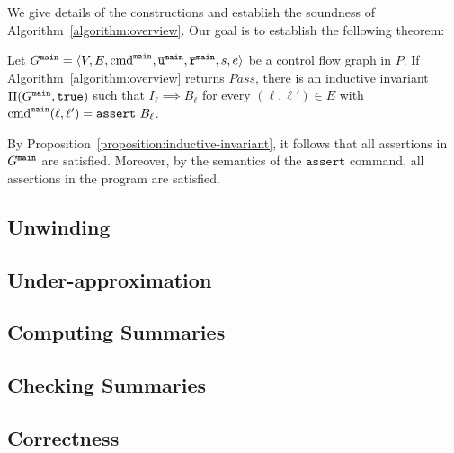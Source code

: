 
We give details of the constructions and establish the soundness of
Algorithm~\ref{algorithm:overview}. Our goal is to establish the
following theorem:

\begin{theorem}
  Let $G^{\mathtt{{main}}} = \langle V, E, \textmd{cmd}^{\mathtt{{main}}} , \overline{\mathtt{u}}^{\mathtt{{main}}}, \overline{\mathtt{r}}^{\mathtt{{main}}},s,e \rangle$ be a control flow
  graph in $P$. If Algorithm~\ref{algorithm:overview} returns
  $\mathit{Pass}$, there is an inductive invariant $\Pi (G^{\mathtt{{main}}}, \mathtt{true})$
  such that $I_{\ell} \implies B_{\ell}$ for every $(\ell, \ell') \in
  E$ with $\textmd{cmd}^{\mathtt{{main}}} (\ell, \ell') = \mathtt{assert\ } B_{\ell}$.
  \label{theorem:soundness}
\end{theorem}
By Proposition~\ref{proposition:inductive-invariant}, it follows that
all assertions in $G^{\mathtt{{main}}}$ are satisfied.
Moreover, by the semantics of the 
$\mathtt{assert}$ command, all assertions in the program are satisfied.



 
\subsection{Unwinding}
\label{subsection:unwinding}


\subsection{Under-approximation}
\label{subsection:under-approximation}


\subsection{Computing Summaries}
\label{subsection:updating-summary}


\subsection{Checking Summaries}
\label{subsection:checking-summary}


\subsection{Correctness}
\label{subsection:correctness}

